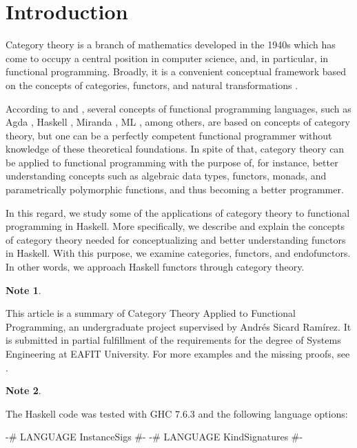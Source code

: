 \documentclass[11pt,letterpaper]{article}
\theoremstyle{definition}
\newtheorem{note}{Note}[section]
\begin{document}

\section{Introduction}
\label{sec:introduction}

Category theory is a branch of mathematics developed in the 1940s
which has come to occupy a central position in computer science, and,
in particular, in functional programming. Broadly, it is a convenient
conceptual framework based on the concepts of categories, functors,
and natural transformations
\parencites[vii]{maclane-1998}[1]{marquis-2013}.

According to \textcite[73]{elkins-2009} and
\textcite[50--51]{yorgey-2009}, several concepts of functional
programming languages, such as Agda \parencites{norell-2007}{agda},
Haskell \parencite{peytonjones-2003}, Miranda \parencite{turner-1985},
ML \parencite{milner-1984}, among others, are based on concepts of
category theory, but one can be a perfectly competent functional
programmer without knowledge of these theoretical foundations. In
spite of that, category theory can be applied to functional
programming with the purpose of, for instance, better understanding
concepts such as algebraic data types, functors, monads, and
parametrically polymorphic functions, and thus becoming a better
programmer.

In this regard, we study some of the applications of category theory
to functional programming in Haskell. More specifically, we describe
and explain the concepts of category theory needed for conceptualizing
and better understanding functors in Haskell. With this purpose, we
examine categories, functors, and endofunctors. In other words, we
approach Haskell functors through category theory.

\begin{note}
  \label{note:cain}

  This article is a summary of Category Theory Applied to Functional
  Programming, an undergraduate project supervised by Andrés Sicard
  Ramírez. It is submitted in partial fulfillment of the requirements
  for the degree of Systems Engineering at EAFIT University. For more
  examples and the missing proofs, see \parencite[§§~2,
    4]{villaisaza-2014}.

\end{note}

\begin{note}
  \label{note:haskell}

  The Haskell code was tested with GHC 7.6.3 and the following
  language options:
  \begin{code}
{-# LANGUAGE InstanceSigs   #-}
{-# LANGUAGE KindSignatures #-}
  \end{code}

\end{note}
\end{document}
